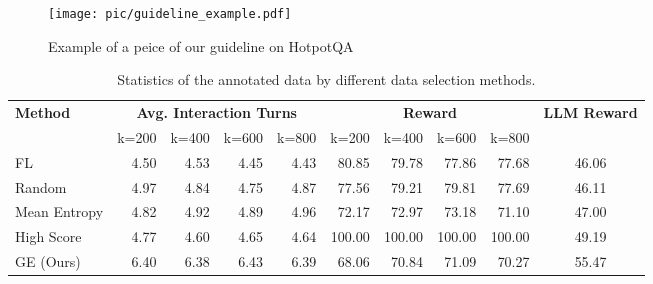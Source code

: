 \begin{figure}[ht]
    \centering
    \texttt{[image: pic/guideline\_example.pdf]}
    \caption{Example of a peice of our guideline on HotpotQA} 
    \label{fig:example_guideline}
\end{figure}

\begin{table*}[t]
    \centering
    \begin{tabular}{@{}lrrrrrrrrc@{}}
        \toprule
        \multirow{2}{*}{\textbf{Method}} & \multicolumn{4}{c}{\textbf{Avg. Interaction Turns}} & \multicolumn{4}{c}{\textbf{Reward}}  &  \multirow{2}{*}{\textbf{LLM Reward}} \\ 
        \cmidrule(lr){2-5} \cmidrule(lr){6-9} 
                                 & k=200 & k=400 & k=600 & k=800 & k=200 & k=400 & k=600 & k=800 & \\ \midrule
        FL                     & 4.50   & 4.53   & 4.45   & 4.43   & 80.85 & 79.78 & 77.86 & 77.68 & 46.06\\
        Random                  & 4.97   & 4.84   & 4.75   & 4.87   & 77.56 & 79.21 & 79.81 & 77.69 & 46.11\\
        Mean Entropy            & 4.82   & 4.92   & 4.89   & 4.96   & 72.17 & 72.97 & 73.18 & 71.10 & 47.00\\
        High Score              & 4.77   & 4.60   & 4.65   & 4.64   & 100.00 & 100.00 & 100.00 & 100.00 & 49.19\\
        \midrule
        GE (Ours)                     & 6.40 & 6.38 & 6.43 & 6.39 & 68.06 & 70.84 & 71.09 & 70.27 & 55.47\\ \bottomrule
    \end{tabular}
    \caption{Statistics of the annotated data by different data selection methods.}

    \label{tab:Statistics}
\end{table*}


